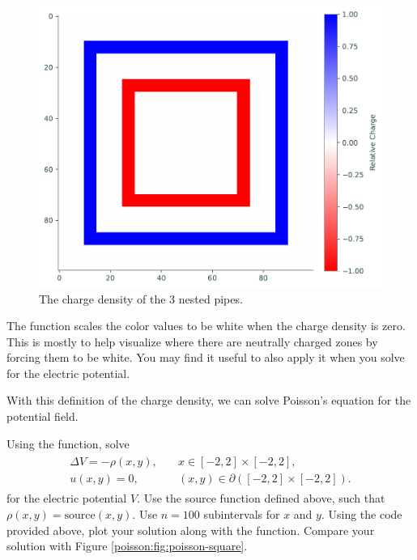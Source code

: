 \begin{figure}
\includegraphics[scale=0.7]{figures/relative_charge.pdf}
\caption{The charge density of the 3 nested pipes.}
\end{figure}


The function  scales the color values to be white when the charge density is zero.
This is mostly to help visualize where there are neutrally charged zones by forcing them to be white.
You may find it useful to also apply it when you solve for the electric  potential.

With this definition of the charge density, we can solve Poisson's equation for the potential field.

\begin{problem}
Using the  function, solve 
\begin{align}
	\begin{split}
	\Delta V = -\rho(x,y), &{}\quad x \in [-2,2]\times [-2,2],\\
	u(x,y) = 0, &{}\quad (x,y) \in \partial ([-2,2]\times [-2,2]).
	\end{split}
	\label{poisson2d:source}
\end{align}
% 
for the electric potential $V.$
Use the source function defined above, such that $\rho(x,y) = \text{source}(x,y)$.
Use $n=100$ subintervals for $x$ and $y$.
Using the code provided above, plot your solution along with the  function.
Compare your solution with Figure \ref{poisson:fig:poisson-square}.
\end{problem}

